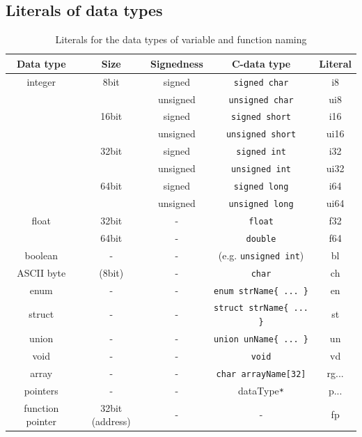 \subsection{Literals of data types}
\label{sec:style:varNaming:ListOfDataType}
\begin{table}[H]
\begin{tabular}{c|c|c|c|c}
\hline
\textbf{Data type} 	& \textbf{Size} 	& \textbf{Signedness} & \textbf{C-data type} 							& \textbf{Literal}\\
\hline
integer 						& 8bit 						& signed 							& \texttt{signed char} 							& i8\\
										&  								& unsigned 						& \texttt{unsigned char}						& ui8\\
										& 16bit						& signed 							& \texttt{signed short} 						& i16\\
										&  								& unsigned 						& \texttt{unsigned short} 					& ui16\\
										& 32bit 					& signed 							&	\texttt{signed int}								& i32\\
										&									& unsigned 						&	\texttt{unsigned int}							& ui32\\
										& 64bit 					& signed 							&	\texttt{signed long}							& i64\\
										&									& unsigned 						&	\texttt{unsigned long}						& ui64\\
float 							& 32bit 					& - 									& \texttt{float}										& f32\\
										& 64bit		 				& - 									&	\texttt{double}										& f64\\
boolean							&	-								& -										& (e.g. \texttt{unsigned int})			& bl\\
ASCII byte					& (8bit) 					& - 									&	\texttt{char}											& ch\\
enum 								& - 							&	-										& \texttt{enum strName\{ ... \}}		& en\\
struct 							& - 							&	-										& \texttt{struct strName\{ ... \}}	& st\\
union 							& - 							&	-										& \texttt{union unName\{ ... \}}		& un\\
void 								& - 							&	-										& \texttt{void}											& vd\\
\hline
array 							& - 							&	-										& \texttt{char arrayName[32]}				& rg...\\
\hline
pointers 						& - 							&	-										& dataType\texttt{*}								& p...\\
function pointer		& 32bit (address) &	-										&	-																	& fp\\
\hline
\end{tabular}
\caption{Literals for the data types of variable and function naming}
\label{tab:style:varNaming:ListOfDataType}
\end{table}

